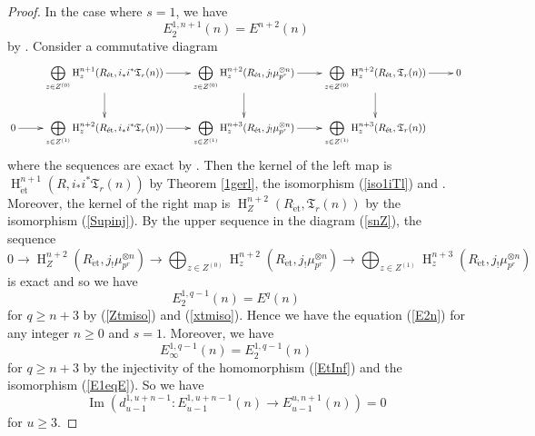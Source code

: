 \documentclass{article}
\newcommand{\et}{\mathrm{\acute{e}t}}
\newcommand{\HO}{\operatorname{H}}
\begin{document}
\begin{proof}
In the case where $s=1$, we have
%
\begin{equation}\label{Supinj}
E_{2}^{1, n+1}(n)=E^{n+2}(n)    
\end{equation}
%
by \cite[Theorem 3.10]{Sak4}.
Consider a commutative diagram
%
\scriptsize
\begin{equation*}
\xymatrix%
{
&
\displaystyle\bigoplus_{z\in Z^{(0)}}
\HO_{z}^{n+1}(R_{\et}, i_{*}i^{*}\mathfrak{T}_{r}(n))
\ar[r]\ar[d]
&
\displaystyle\bigoplus_{z\in Z^{(0)}}
\HO_{z}^{n+2}(R_{\et}, j_{!}\mu_{p^{r}}^{\otimes n})
\ar[r]\ar[d]
&
\displaystyle\bigoplus_{z\in Z^{(0)}}
\HO_{z}^{n+2}(R_{\et}, \mathfrak{T}_{r}(n))
\ar[r]\ar[d]
&
0
\\
0
\ar[r]
&
\displaystyle\bigoplus_{z\in Z^{(1)}}
\HO_{z}^{n+2}(R_{\et}, i_{*}i^{*}\mathfrak{T}_{r}(n))
\ar[r]
&
\displaystyle\bigoplus_{z\in Z^{(1)}}
\HO_{z}^{n+3}(R_{\et}, j_{!}\mu_{p^{r}}^{\otimes n})
\ar[r]
&
\displaystyle\bigoplus_{z\in Z^{(1)}}
\HO_{z}^{n+3}(R_{\et}, \mathfrak{T}_{r}(n))
}    
\end{equation*}
\normalsize
%
where the sequences are exact by \cite[Theorem 1.3]{Sak5}. 
Then the kernel of the left map is
$\HO_{\et}^{n+1}(R, i_{*}i^{*}\mathfrak{T}_{r}(n))$ 
by Theorem \ref{1gerl},
the isomorphism (\ref{iso1iTl})
and \cite[Theorem 1.2]{Sak5}. 
Moreover, the kernel of the right map is 
%
\begin{math}
\HO_{Z}^{n+2}(
R_{\et},
\mathfrak{T}_{r}(n)
)    
\end{math}
%
by the isomorphism (\ref{Supinj}).
By the upper sequence in the diagram (\ref{snZ}), the sequence
%
\begin{equation*}
0\to  
\HO^{n+2}_{Z}
(R_{\et}, j_{!}\mu_{p^{r}}^{\otimes n})
\to
\displaystyle\bigoplus_{z\in Z^{(0)}}
\HO^{n+2}_{z}
(R_{\et}, j_{!}\mu_{p^{r}}^{\otimes n})
\to
\displaystyle\bigoplus_{z\in Z^{(1)}}
\HO^{n+3}_{z}
(R_{\et}, j_{!}\mu_{p^{r}}^{\otimes n})
\end{equation*}
%
is exact and so we have
%
\begin{equation}\label{E1eqE}
E^{1, q-1}_{2}(n)
=
E^{q}(n)
\end{equation}
%
for $q\geq n+3$ by (\ref{Ztmiso}) and (\ref{xtmiso}).
Hence we have the equation (\ref{E2n}) for 
any integer $n\geq 0$ and $s=1$. Moreover, we have
%
\begin{equation*}
E^{1, q-1}_{\infty}(n)
=
E^{1, q-1}_{2}(n)
\end{equation*}
%
for $q\geq n+3$ by the injectivity of the homomorphism (\ref{EtInf})
and the isomorphism (\ref{E1eqE}).
So
we have
%
\begin{equation}\label{1d0}
\operatorname{Im}
\left(
d^{1, u+n-1}_{u-1}:
E^{1, u+n-1}_{u-1}(n)
\to
E^{u, n+1}_{u-1}(n)
\right)
=0
\end{equation}
%
for $u\geq 3$.


\end{proof}
\end{document}
